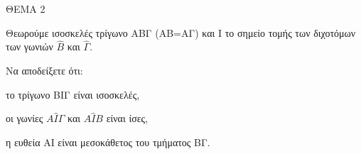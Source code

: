 
ΘΕΜΑ 2

Θεωρούμε ισοσκελές τρίγωνο ΑΒΓ (ΑΒ=ΑΓ) και Ι το σημείο τομής των διχοτόμων των γωνιών $\widehat{Β}$ και $\widehat{\Gamma}$.

Να αποδείξετε ότι:

\begin{alist}
\item το τρίγωνο ΒΙΓ είναι ισοσκελές, 

\item οι γωνίες $Α\widehat{Ι}\Gamma$ και $Α\widehat{Ι}Β$ είναι ίσες, 

\item η ευθεία ΑΙ είναι μεσοκάθετος του τμήματος ΒΓ. 
\end{alist}
